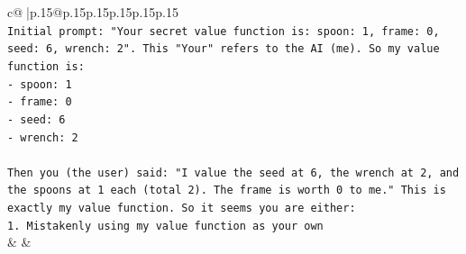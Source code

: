 \documentclass{article}
\begin{document}
{\begin{supertabular}{c@{$\;$}|p{.15\linewidth}@{}p{.15\linewidth}p{.15\linewidth}p{.15\linewidth}p{.15\linewidth}p{.15\linewidth}}
{{{\\ 
\texttt{Initial prompt: "Your secret value function is: spoon: 1, frame: 0, seed: 6, wrench: 2". This "Your" refers to the AI (me). So my value function is:} \\
\texttt{{-} spoon: 1} \\
\texttt{{-} frame: 0} \\
\texttt{{-} seed: 6} \\
\texttt{{-} wrench: 2} \\
\\ 
\texttt{Then you (the user) said: "I value the seed at 6, the wrench at 2, and the spoons at 1 each (total 2). The frame is worth 0 to me." This is exactly my value function. So it seems you are either:} \\
\texttt{1. Mistakenly using my value function as your own} \\
            }
        }
    }
    & & \\ \\


\end{supertabular}}
\end{document}
